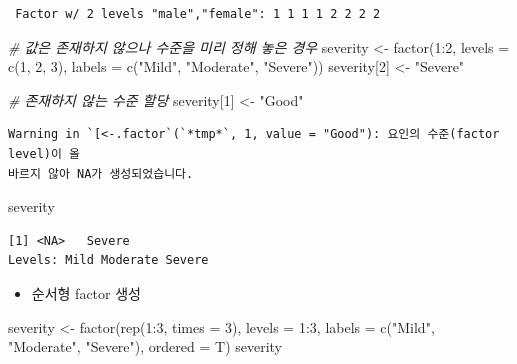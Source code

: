 \documentclass[
  11pt,
]{krantz}
\newenvironment{Shaded}{\begin{snugshade}}{\end{snugshade}}
\newcommand{\AttributeTok}[1]{\textcolor[rgb]{0.61,0.61,0.61}{#1}}
\newcommand{\CommentTok}[1]{\textcolor[rgb]{0.37,0.37,0.37}{\textit{#1}}}
\newcommand{\DecValTok}[1]{\textcolor[rgb]{0.06,0.06,0.06}{#1}}
\newcommand{\FunctionTok}[1]{\textcolor[rgb]{0,0,0}{#1}}
\newcommand{\NormalTok}[1]{#1}
\newcommand{\OtherTok}[1]{\textcolor[rgb]{0.37,0.37,0.37}{#1}}
\newcommand{\SpecialCharTok}[1]{\textcolor[rgb]{0,0,0}{#1}}
\newcommand{\StringTok}[1]{\textcolor[rgb]{0.5,0.5,0.5}{#1}}
\providecommand{\tightlist}{%
  \setlength{\itemsep}{0pt}\setlength{\parskip}{0pt}}
\begin{document}
\begin{verbatim}
 Factor w/ 2 levels "male","female": 1 1 1 1 2 2 2 2
\end{verbatim}

\begin{Shaded}
\begin{Highlighting}[]
\CommentTok{\# 값은 존재하지 않으나 수준을 미리 정해 놓은 경우}
\NormalTok{severity }\OtherTok{\textless{}{-}} \FunctionTok{factor}\NormalTok{(}\DecValTok{1}\SpecialCharTok{:}\DecValTok{2}\NormalTok{, }\AttributeTok{levels =} \FunctionTok{c}\NormalTok{(}\DecValTok{1}\NormalTok{, }\DecValTok{2}\NormalTok{, }\DecValTok{3}\NormalTok{), }\AttributeTok{labels =} \FunctionTok{c}\NormalTok{(}\StringTok{"Mild"}\NormalTok{, }\StringTok{"Moderate"}\NormalTok{, }\StringTok{"Severe"}\NormalTok{))}
\NormalTok{severity[}\DecValTok{2}\NormalTok{] }\OtherTok{\textless{}{-}} \StringTok{"Severe"}

\CommentTok{\# 존재하지 않는 수준 할당 }
\NormalTok{severity[}\DecValTok{1}\NormalTok{] }\OtherTok{\textless{}{-}} \StringTok{"Good"}
\end{Highlighting}
\end{Shaded}

\begin{verbatim}
Warning in `[<-.factor`(`*tmp*`, 1, value = "Good"): 요인의 수준(factor level)이 올
바르지 않아 NA가 생성되었습니다.
\end{verbatim}

\begin{Shaded}
\begin{Highlighting}[]
\NormalTok{severity}
\end{Highlighting}
\end{Shaded}

\begin{verbatim}
[1] <NA>   Severe
Levels: Mild Moderate Severe
\end{verbatim}

\normalsize

\begin{itemize}
\tightlist
\item
  순서형 factor 생성
\end{itemize}

\footnotesize

\begin{Shaded}
\begin{Highlighting}[]
\NormalTok{severity }\OtherTok{\textless{}{-}} \FunctionTok{factor}\NormalTok{(}\FunctionTok{rep}\NormalTok{(}\DecValTok{1}\SpecialCharTok{:}\DecValTok{3}\NormalTok{, }\AttributeTok{times =} \DecValTok{3}\NormalTok{), }\AttributeTok{levels =} \DecValTok{1}\SpecialCharTok{:}\DecValTok{3}\NormalTok{, }
                   \AttributeTok{labels =} \FunctionTok{c}\NormalTok{(}\StringTok{"Mild"}\NormalTok{, }\StringTok{"Moderate"}\NormalTok{, }\StringTok{"Severe"}\NormalTok{), }
                   \AttributeTok{ordered =}\NormalTok{ T)}
\NormalTok{severity}
\end{Highlighting}
\end{Shaded}
\end{document}

